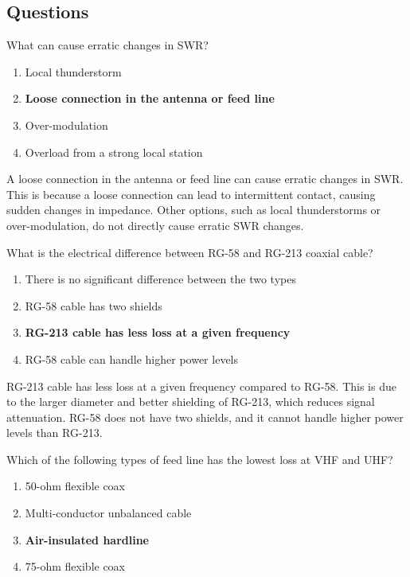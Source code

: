 \subsection*{Questions}

\begin{tcolorbox}[colback=gray!10!white,colframe=black!75!black,title={T9B09}]
What can cause erratic changes in SWR?
\begin{enumerate}[label=\Alph*,noitemsep]
    \item Local thunderstorm
    \item \textbf{Loose connection in the antenna or feed line}
    \item Over-modulation
    \item Overload from a strong local station
\end{enumerate}
\end{tcolorbox}

A loose connection in the antenna or feed line can cause erratic changes in SWR. This is because a loose connection can lead to intermittent contact, causing sudden changes in impedance. Other options, such as local thunderstorms or over-modulation, do not directly cause erratic SWR changes.


\begin{tcolorbox}[colback=gray!10!white,colframe=black!75!black,title={T9B10}]
What is the electrical difference between RG-58 and RG-213 coaxial cable?
\begin{enumerate}[label=\Alph*,noitemsep]
    \item There is no significant difference between the two types
    \item RG-58 cable has two shields
    \item \textbf{RG-213 cable has less loss at a given frequency}
    \item RG-58 cable can handle higher power levels
\end{enumerate}
\end{tcolorbox}

RG-213 cable has less loss at a given frequency compared to RG-58. This is due to the larger diameter and better shielding of RG-213, which reduces signal attenuation. RG-58 does not have two shields, and it cannot handle higher power levels than RG-213.


\begin{tcolorbox}[colback=gray!10!white,colframe=black!75!black,title={T9B11}]
Which of the following types of feed line has the lowest loss at VHF and UHF?
\begin{enumerate}[label=\Alph*,noitemsep]
    \item 50-ohm flexible coax
    \item Multi-conductor unbalanced cable
    \item \textbf{Air-insulated hardline}
    \item 75-ohm flexible coax
\end{enumerate}
\end{tcolorbox}

